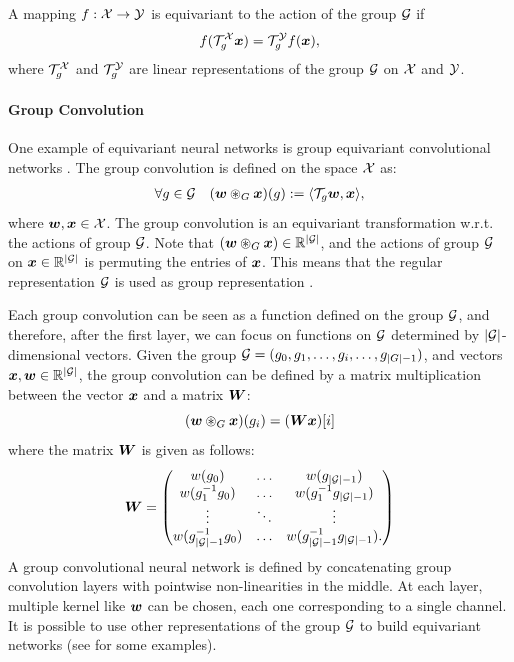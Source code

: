 A mapping $f:{\mathcal{X}}\to{\mathcal{Y}}$ is equivariant to the action of the group ${\mathcal{G}}$ if
\[
f({\mathcal{T}}^{{\mathcal{X}}}_g{\bm{x}}) ={\mathcal{T}}^{{\mathcal{Y}}}_g f({\bm{x}}),
\]
where ${\mathcal{T}}^{{\mathcal{X}}}_g$ and ${\mathcal{T}}^{{\mathcal{Y}}}_g$ are linear representations of the group ${\mathcal{G}}$ on ${\mathcal{X}}$ and ${\mathcal{Y}}$. 


\paragraph{Group Convolution} One example of equivariant neural networks is  group equivariant convolutional networks \cite{cohen2016group}. 
The group convolution is defined on the space ${\mathcal{X}}$ as:
\begin{align}
    \forall g \in \gG \quad  (\vw \gconv \vx)(g) := \langle \gT_g\vw, \vx \rangle, 
\label{def:group_conv}
\end{align}
where ${\bm{w}},{\bm{x}}\in{\mathcal{X}}$. The group convolution is an equivariant transformation w.r.t. the actions of group ${\mathcal{G}}$. Note that $({\bm{w}} \circledast_{G} {\bm{x}})\in\mathbb{R}^{|{\mathcal{G}}|}$, and the actions of group ${\mathcal{G}}$ on ${\bm{x}}\in\mathbb{R}^{|{\mathcal{G}}|}$ is permuting the entries of ${\bm{x}}$. This means that the regular representation ${\mathcal{G}}$ is used as group representation \cite{serre1977linear}. 

Each group convolution can be seen as a function defined on the group ${\mathcal{G}}$, and therefore, after the first layer, we can focus on functions on ${\mathcal{G}}$ determined by $|{\mathcal{G}}|$-dimensional vectors. 
Given the group ${\mathcal{G}}=(g_0, g_1, \dots, g_i, \dots, g_{|G|-1})$, and vectors ${\bm{x}}, {\bm{w}} \in \mathbb{R}^{|{\mathcal{G}}|}$, the group convolution can be defined by a matrix multiplication between the vector ${\bm{x}}$ and a matrix ${\bm{W}}$:
\begin{equation}
    ({\bm{w}} \circledast_{G} {\bm{x}})(g_i) = ({\bm{W}}{\bm{x}})[i]
\end{equation}
where the matrix ${\bm{W}}$ is given as follows:
\begin{equation}
    \mW=\begin{pmatrix}
    w(g_0)& \dots & w(g_{|\gG|-1})\\
    w(g_1^{-1}g_0) & \dots&   w(g_1^{-1}g_{|\gG|-1})\\
    \vdots &\ddots &\vdots \\
    w(g_{|\gG|-1}^{-1}g_0) & \dots&   w(g_{|\gG|-1}^{-1}g_{|\gG|-1}).\\
    \end{pmatrix}
\label{eq:group_circulant}
\end{equation}
A group convolutional neural network is defined by concatenating group convolution layers with pointwise non-linearities in the middle. At each layer, multiple 
kernel like ${\bm{w}}$ can be chosen, each one corresponding to a single channel. It is possible to use other representations of the group ${\mathcal{G}}$ to build equivariant networks (see \citet{cohen_steerable_2016,e2cnn} for some examples). 

